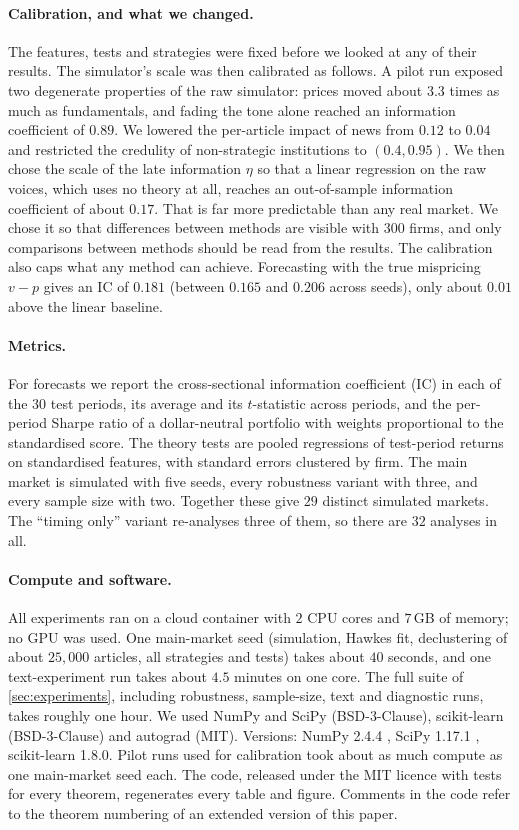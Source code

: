 \documentclass{article}
\theoremstyle{plain}
\theoremstyle{definition}
\theoremstyle{remark}
\begin{document}
\paragraph{Calibration, and what we changed.} The features, tests and strategies were fixed before we looked at any of their results. The simulator's scale was then calibrated as follows. A pilot run exposed two degenerate properties of the raw simulator: prices moved about $3.3$ times as much as fundamentals, and fading the tone alone reached an information coefficient of $0.89$. We lowered the per-article impact of news from $0.12$ to $0.04$ and restricted the credulity of non-strategic institutions to $(0.4,0.95)$. We then chose the scale of the late information $\eta$ so that a linear regression on the raw voices, which uses no theory at all, reaches an out-of-sample information coefficient of about $0.17$. That is far more predictable than any real market. We chose it so that differences between methods are visible with $300$ firms, and only comparisons between methods should be read from the results. The calibration also caps what any method can achieve. Forecasting with the true mispricing $v-p$ gives an IC of $0.181$ (between $0.165$ and $0.206$ across seeds), only about $0.01$ above the linear baseline.

\paragraph{Metrics.} For forecasts we report the cross-sectional information coefficient (IC) in each of the $30$ test periods, its average and its $t$-statistic across periods, and the per-period Sharpe ratio of a dollar-neutral portfolio with weights proportional to the standardised score. The theory tests are pooled regressions of test-period returns on standardised features, with standard errors clustered by firm. The main market is simulated with five seeds, every robustness variant with three, and every sample size with two. Together these give $29$ distinct simulated markets. The ``timing only'' variant re-analyses three of them, so there are $32$ analyses in all.

\paragraph{Compute and software.} All experiments ran on a cloud container with $2$ CPU cores and $7$\,GB of memory; no GPU was used. One main-market seed (simulation, Hawkes fit, declustering of about $25{,}000$ articles, all strategies and tests) takes about $40$ seconds, and one text-experiment run takes about $4.5$ minutes on one core. The full suite of \cref{sec:experiments}, including robustness, sample-size, text and diagnostic runs, takes roughly one hour. We used NumPy and SciPy (BSD-3-Clause), scikit-learn \citep{pedregosa2011} (BSD-3-Clause) and autograd (MIT). Versions: NumPy 2.4.4 \citep{harris2020}, SciPy 1.17.1 \citep{virtanen2020}, scikit-learn 1.8.0. Pilot runs used for calibration took about as much compute as one main-market seed each. The code, released under the MIT licence with tests for every theorem, regenerates every table and figure. Comments in the code refer to the theorem numbering of an extended version of this paper.
\end{document}
